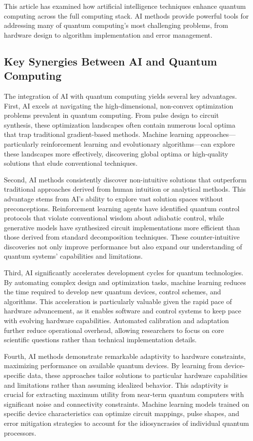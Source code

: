 This article has examined how artificial intelligence techniques enhance quantum computing across the full computing stack. AI methods provide powerful tools for addressing many of quantum computing's most challenging problems, from hardware design to algorithm implementation and error management.

\subsection{Key Synergies Between AI and Quantum Computing}

The integration of AI with quantum computing yields several key advantages. First, AI excels at navigating the high-dimensional, non-convex optimization problems prevalent in quantum computing. From pulse design to circuit synthesis, these optimization landscapes often contain numerous local optima that trap traditional gradient-based methods. Machine learning approaches—particularly reinforcement learning and evolutionary algorithms—can explore these landscapes more effectively, discovering global optima or high-quality solutions that elude conventional techniques.

Second, AI methods consistently discover non-intuitive solutions that outperform traditional approaches derived from human intuition or analytical methods. This advantage stems from AI's ability to explore vast solution spaces without preconceptions. Reinforcement learning agents have identified quantum control protocols that violate conventional wisdom about adiabatic control, while generative models have synthesized circuit implementations more efficient than those derived from standard decomposition techniques. These counter-intuitive discoveries not only improve performance but also expand our understanding of quantum systems' capabilities and limitations.

Third, AI significantly accelerates development cycles for quantum technologies. By automating complex design and optimization tasks, machine learning reduces the time required to develop new quantum devices, control schemes, and algorithms. This acceleration is particularly valuable given the rapid pace of hardware advancement, as it enables software and control systems to keep pace with evolving hardware capabilities. Automated calibration and adaptation further reduce operational overhead, allowing researchers to focus on core scientific questions rather than technical implementation details.

Fourth, AI methods demonstrate remarkable adaptivity to hardware constraints, maximizing performance on available quantum devices. By learning from device-specific data, these approaches tailor solutions to particular hardware capabilities and limitations rather than assuming idealized behavior. This adaptivity is crucial for extracting maximum utility from near-term quantum computers with significant noise and connectivity constraints. Machine learning models trained on specific device characteristics can optimize circuit mappings, pulse shapes, and error mitigation strategies to account for the idiosyncrasies of individual quantum processors.

